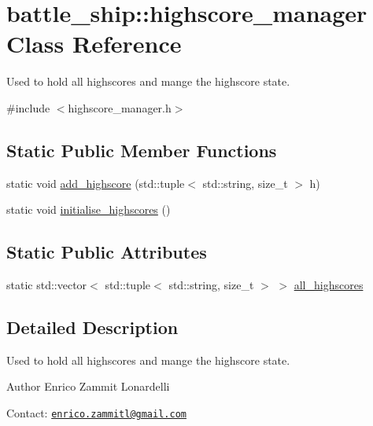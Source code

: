 \hypertarget{classbattle__ship_1_1highscore__manager}{}\section{battle\+\_\+ship\+:\+:highscore\+\_\+manager Class Reference}
\label{classbattle__ship_1_1highscore__manager}


Used to hold all highscores and mange the highscore state.  




{\ttfamily \#include $<$highscore\+\_\+manager.\+h$>$}

\subsection*{Static Public Member Functions}
\begin{DoxyCompactItemize}
\item 
static void \hyperlink{classbattle__ship_1_1highscore__manager_ad53b09dec3b84ab8cc9ccf607ea1ffd8}{add\+\_\+highscore} (std\+::tuple$<$ std\+::string, size\+\_\+t $>$ h)
\item 
static void \hyperlink{classbattle__ship_1_1highscore__manager_a404a994ea85111522a7a4f571bcbacdc}{initialise\+\_\+highscores} ()
\end{DoxyCompactItemize}
\subsection*{Static Public Attributes}
\begin{DoxyCompactItemize}
\item 
static std\+::vector$<$ std\+::tuple$<$ std\+::string, size\+\_\+t $>$ $>$ \hyperlink{classbattle__ship_1_1highscore__manager_a3a51d2dfb6210fea016ef59238d35861}{all\+\_\+highscores}
\end{DoxyCompactItemize}


\subsection{Detailed Description}
Used to hold all highscores and mange the highscore state. 

\begin{DoxyAuthor}{Author}
Enrico Zammit Lonardelli
\end{DoxyAuthor}
Contact\+: \href{mailto:enrico.zammitl@gmail.com}{\tt enrico.\+zammitl@gmail.\+com}

